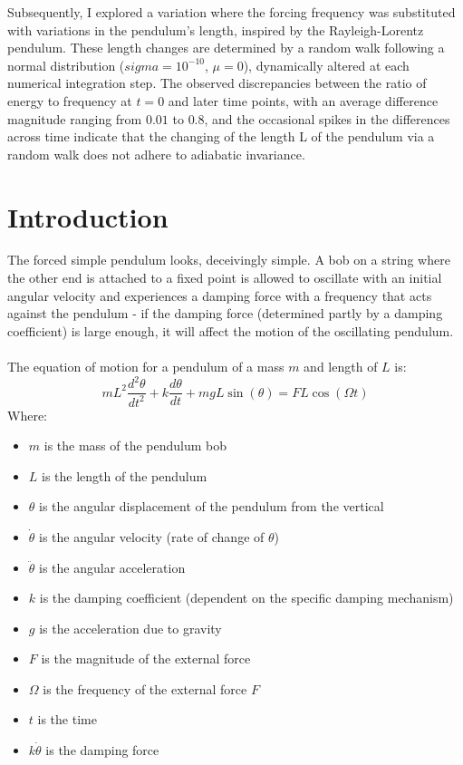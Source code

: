 \documentclass[10pt, twocolumn]{article}
\begin{document}
Subsequently, I explored a variation where the forcing frequency was substituted with variations in the pendulum's length, inspired by the Rayleigh-Lorentz pendulum. These length changes are determined by a random walk following a normal distribution ($sigma = 10^{-10}$, $\mu = 0$), dynamically altered at each numerical integration step. The observed discrepancies between the ratio of energy to frequency at $t = 0$ and later time points, with an average difference magnitude ranging from $0.01$ to $0.8$, and the occasional spikes in the differences across time indicate that the changing of the length L of the pendulum via a random walk does not adhere to adiabatic invariance.
\twocolumn
\newpage
\setcounter{page}{1}
\section{Introduction}
The forced simple pendulum looks, deceivingly simple. A bob on a string where the other end is attached to a fixed point is allowed to oscillate with an initial angular velocity and experiences a damping force with a frequency that acts against the pendulum - if the damping force (determined partly by a damping coefficient) is large enough, it will affect the motion of the oscillating pendulum. \\
\\
The equation of motion for a pendulum of a mass $m$ and length of $L$ is:
\begin{equation}
    mL^2 \frac{d^2\theta}{dt^2} + k \frac{d\theta}{dt} + mgL\sin({\theta}) = FL\cos({\Omega}t)
    \label{oscillation}
\end{equation}
Where:
\begin{itemize}
    \item $m$ is the mass of the pendulum bob
    \item $L$ is the length of the pendulum
    \item $\theta$ is the angular displacement of the pendulum from the vertical
    \item $\dot{\theta}$ is the angular velocity (rate of change of $\theta$)
    \item $\ddot{\theta}$ is the angular acceleration
    \item $k$ is the damping coefficient (dependent on the specific damping mechanism)
    \item $g$ is the acceleration due to gravity
    \item $F$ is the magnitude of the external force
    \item $\Omega$ is the frequency of the external force $F$
    \item $t$ is the time
    \item $k\dot{\theta}$ is the damping force
\end{itemize}
\end{document}
